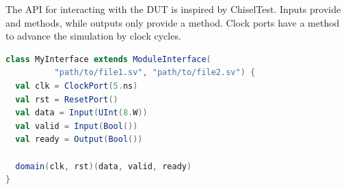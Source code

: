 The API for interacting with the DUT is inspired by ChiselTest. Inputs provide  and  methods, while outputs only provide a  method. Clock ports have a  method to advance the simulation by  clock cycles. 






\begin{listing}
\begin{lstlisting}[language=scala, captionpos=b, caption=Example for an interface declaration in Scala. Each data signal is assocaited with a clock domain.,label=lst:interface]
class MyInterface extends ModuleInterface(
          "path/to/file1.sv", "path/to/file2.sv") {
  val clk = ClockPort(5.ns)
  val rst = ResetPort()
  val data = Input(UInt(8.W))
  val valid = Input(Bool())
  val ready = Output(Bool())

  domain(clk, rst)(data, valid, ready)
}
\end{lstlisting}
\end{listing}

